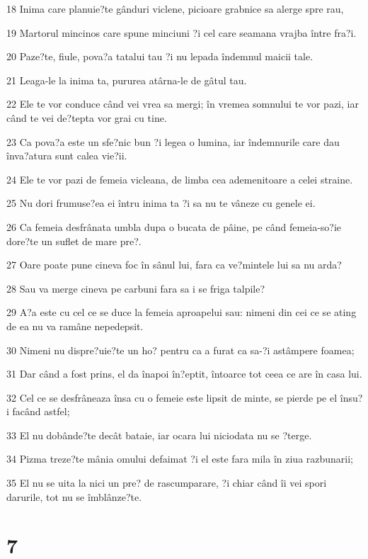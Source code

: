 \par 18 Inima care planuie?te gânduri viclene, picioare grabnice sa alerge spre rau,
\par 19 Martorul mincinos care spune minciuni ?i cel care seamana vrajba între fra?i.
\par 20 Paze?te, fiule, pova?a tatalui tau ?i nu lepada îndemnul maicii tale.
\par 21 Leaga-le la inima ta, pururea atârna-le de gâtul tau.
\par 22 Ele te vor conduce când vei vrea sa mergi; în vremea somnului te vor pazi, iar când te vei de?tepta vor grai cu tine.
\par 23 Ca pova?a este un sfe?nic bun ?i legea o lumina, iar îndemnurile care dau înva?atura sunt calea vie?ii.
\par 24 Ele te vor pazi de femeia vicleana, de limba cea ademenitoare a celei straine.
\par 25 Nu dori frumuse?ea ei întru inima ta ?i sa nu te vâneze cu genele ei.
\par 26 Ca femeia desfrânata umbla dupa o bucata de pâine, pe când femeia-so?ie dore?te un suflet de mare pre?.
\par 27 Oare poate pune cineva foc în sânul lui, fara ca ve?mintele lui sa nu arda?
\par 28 Sau va merge cineva pe carbuni fara sa i se friga talpile?
\par 29 A?a este cu cel ce se duce la femeia aproapelui sau: nimeni din cei ce se ating de ea nu va ramâne nepedepsit.
\par 30 Nimeni nu dispre?uie?te un ho? pentru ca a furat ca sa-?i astâmpere foamea;
\par 31 Dar când a fost prins, el da înapoi în?eptit, întoarce tot ceea ce are în casa lui.
\par 32 Cel ce se desfrâneaza însa cu o femeie este lipsit de minte, se pierde pe el însu?i facând astfel;
\par 33 El nu dobânde?te decât bataie, iar ocara lui niciodata nu se ?terge.
\par 34 Pizma treze?te mânia omului defaimat ?i el este fara mila în ziua razbunarii;
\par 35 El nu se uita la nici un pre? de rascumparare, ?i chiar când îi vei spori darurile, tot nu se îmblânze?te.

\chapter{7}

